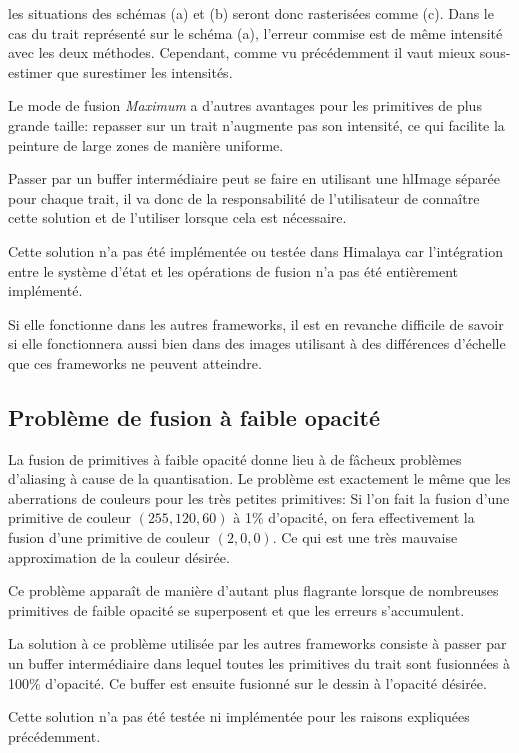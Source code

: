 			les situations des schémas (a) et (b) seront donc rasterisées comme (c). Dans le cas du trait représenté sur le schéma (a), 
			l'erreur commise est de même intensité avec les deux méthodes. Cependant, comme vu précédemment il vaut mieux
			sous-estimer que surestimer les intensités. 

			Le mode de fusion \emph{Maximum} a d'autres avantages pour les primitives de plus grande taille: repasser 
			sur un trait n'augmente pas son intensité, ce qui facilite la peinture de large zones de manière uniforme. 

			Passer par un buffer intermédiaire peut se faire en utilisant une hlImage séparée pour chaque trait, il va
			donc de la responsabilité de l'utilisateur de connaître cette solution et de l'utiliser lorsque cela
			est nécessaire. 
			
			Cette solution n'a pas été implémentée ou testée dans Himalaya car l'intégration entre le système d'état et
			les opérations de fusion n'a pas été entièrement implémenté. 
			
			Si elle fonctionne dans les autres frameworks, il est en revanche difficile de savoir si elle fonctionnera 
			aussi bien dans des images utilisant à des différences d'échelle que ces frameworks ne peuvent atteindre. 
			
		\subsection{Problème de fusion à faible opacité}
			La fusion de primitives à faible opacité donne lieu à de fâcheux problèmes d'aliasing à cause de la quantisation.
			Le problème est exactement le même que les aberrations de couleurs pour les très petites primitives: Si l'on
			fait la fusion d'une primitive de couleur $(255,120,60)$ à 1\% d'opacité, on fera effectivement la fusion d'une
			primitive de couleur $(2,0,0)$. Ce qui est une très mauvaise approximation de la couleur désirée. 
			
			Ce problème apparaît de manière d'autant plus flagrante lorsque de nombreuses primitives de faible opacité se
			superposent et que les erreurs s'accumulent. 

			La solution à ce problème utilisée par les autres frameworks consiste à passer par un buffer intermédiaire 
			dans lequel toutes les primitives du trait sont fusionnées à 100\% d'opacité. Ce buffer est ensuite fusionné
			sur le dessin à l'opacité désirée. 

			Cette solution n'a pas été testée ni implémentée pour les raisons expliquées précédemment.  

